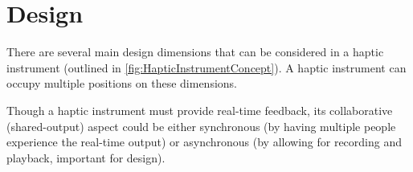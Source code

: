 




%
% 
\section{Design}

There are several main design dimensions that can be considered in a haptic instrument (outlined in \autoref{fig:HapticInstrumentConcept}).
A haptic instrument can occupy multiple positions on these dimensions.


Though a haptic instrument must provide real-time feedback, its collaborative (shared-output) aspect could be either synchronous (by having multiple people experience the real-time output) or asynchronous (by allowing for recording and playback, important for design).


